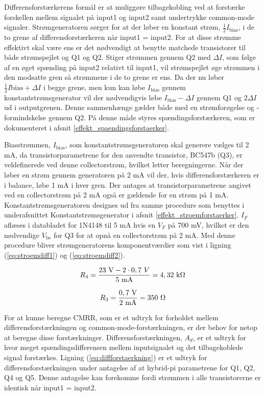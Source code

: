 Differensforstærkerens formål er at muliggøre tilbagekobling ved at forstærke forskellen mellem signalet på input1 og input2 samt undertrykke common-mode signaler. Strømgeneratoren sørger for at der løber en konstant strøm, $\frac{1}{2}I_\mathrm{bias}$, i de to grene af differensforstærkeren når input1 = input2. For at disse strømme effektivt skal være ens er det nødvendigt at benytte matchede transistorer til både strømspejlet og Q1 og Q2. Stiger strømmen gennem Q2 med $\Delta I$, som følge af en øget spænding på input2 relativt til input1, vil strømspejlet øge strømmen i den modsatte gren så strømmene i de to grene er ens. Da der nu løber $\frac{1}{2}I\mathrm{bias} + \Delta I$ i begge grene, men kun kan løbe $I_\mathrm{bias}$ gennem konstantstrømsgenerator vil der nødvendigvis løbe $I_\mathrm{bias} -\Delta I$ gennem Q1 og $2\Delta I$ ud i outputgrenen. Denne sammenhænge gælder både med en strømforøgelse og -formindskelse gennem Q2. På denne måde styres spændingsforstærkeren, som er dokumenteret i afsnit \ref{effekt_spaendingsforstaerker}. 

Biasstrømmen, $I_\mathrm{bias}$, som konstantstrømsgeneratoren skal generere vælges til 2 mA, da transistorparametrene for den anvendte transistor, BC547b (Q3), er veldefinerede ved denne collectorstrøm, hvilket letter beregningerne. Når der løber en strøm gennem generatoren på 2 mA vil der, hvis differensforstærkeren er i balance, løbe 1 mA i hver gren. Der antages at transistorparametrene angivet ved en collectorstrøm på 2 mA også er gældende for en strøm på 1 mA. 
Konstantstrømsgeneratoren designes ud fra samme procedure som benyttes i underafsnittet Konstantstrømsgenerator i afsnit \ref{effekt_stroemforstaerker}. $I_F$ aflæses i databladet for 1N4148 til 5 mA hvis en $V_F$ på 700 mV, hvilket er den nødvendige $V_\mathrm{be}$ for Q3 for at opnå en collectorstrøm på 2 mA. Med denne procedure bliver strømgeneratorens komponentværdier som vist i ligning (\ref{eq:stroemdiff1}) og (\ref{eq:stroemdiff2}).

\begin{equation}
\label{eq:stroemdiff1}
R_4=\frac{23~\mathrm{V}-2 \cdot 0,7~V}{5~\mathrm{mA}}=4,32~\mathrm{k}\ohm
\end{equation}

\begin{equation}
\label{eq:stroemdiff2}
R_3=\frac{0,7~\mathrm{V}}{2~\mathrm{mA}}=350~\ohm
\end{equation}

For at kunne beregne CMRR, som er et udtryk for forholdet mellem differensforstærkningen og common-mode-forstærkningen, er der behov for netop at beregne disse forstærkninger. 
Differensforstærkningen, $A_d$, er et udtryk for hvor meget spændingsdifferensen mellem inputsignalet og det tilbagekoblede signal forstærkes. Ligning (\ref{eq:diffforstaerkning}) er et udtryk for differensforstærkningen under antagelse af at hybrid-pi parametrene for Q1, Q2, Q4 og Q5. Denne antagelse kan forekomme fordi strømmen i alle transistorerne er identisk når input1 = input2.


